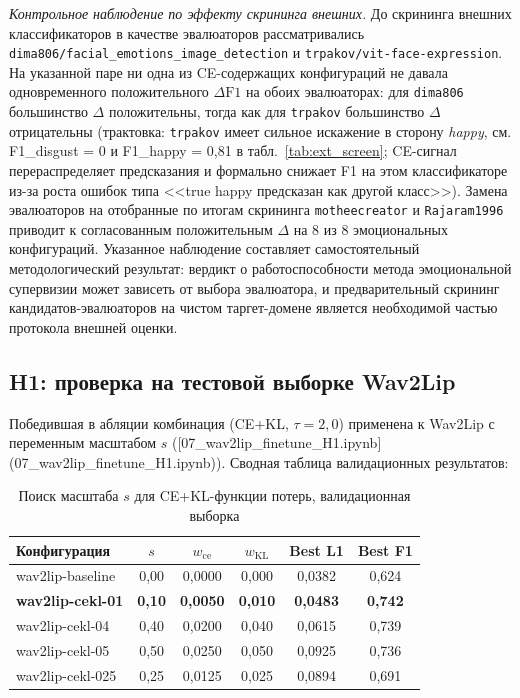 \documentclass[a4paper, 12pt, oneside, openany]{article}
\begin{document}
\textit{Контрольное наблюдение по эффекту скрининга внешних.} До скрининга внешних классификаторов в качестве эвалюаторов рассматривались \texttt{dima806/facial\_emotions\_image\_detection} и \texttt{trpakov/vit-face-expression}. На указанной паре ни одна из CE-содержащих конфигураций не давала одновременного положительного $\Delta\text{F1}$ на обоих эвалюаторах: для \texttt{dima806} большинство $\Delta$ положительны, тогда как для \texttt{trpakov} большинство $\Delta$ отрицательны (трактовка: \texttt{trpakov} имеет сильное искажение в сторону \textit{happy}, см. F1\_disgust = 0 и F1\_happy = 0,81 в табл.~\ref{tab:ext_screen}; CE-сигнал перераспределяет предсказания и формально снижает F1 на этом классификаторе из-за роста ошибок типа <<true happy предсказан как другой класс>>). Замена эвалюаторов на отобранные по итогам скрининга \texttt{motheecreator} и \texttt{Rajaram1996} приводит к согласованным положительным $\Delta$ на 8 из 8 эмоциональных конфигураций. Указанное наблюдение составляет самостоятельный методологический результат: вердикт о работоспособности метода эмоциональной супервизии может зависеть от выбора эвалюатора, и предварительный скрининг кандидатов-эвалюаторов на чистом таргет-домене является необходимой частью протокола внешней оценки.

\subsection{H1: проверка на тестовой выборке Wav2Lip}

Победившая в абляции комбинация (CE+KL, $\tau=2{,}0$) применена к Wav2Lip с переменным масштабом $s$ ([07\_wav2lip\_finetune\_H1.ipynb](07\_wav2lip\_finetune\_H1.ipynb)). Сводная таблица валидационных результатов:

\begin{table}[H]
\caption{Поиск масштаба $s$ для CE+KL-функции потерь, валидационная выборка}
\label{tab:scale_sweep}
\centering
\small
\begin{tabular}{|p{2.7cm}|c|c|c|c|c|}
\hline
\textbf{Конфигурация} & $s$ & $w_{\text{ce}}$ & $w_{\text{KL}}$ & \textbf{Best L1} & \textbf{Best F1} \\
\hline
wav2lip-baseline & 0,00 & 0,0000 & 0,000 & 0,0382 & 0,624 \\
\hline
\textbf{wav2lip-cekl-01} & \textbf{0,10} & \textbf{0,0050} & \textbf{0,010} & \textbf{0,0483} & \textbf{0,742} \\
\hline
wav2lip-cekl-04 & 0,40 & 0,0200 & 0,040 & 0,0615 & 0,739 \\
\hline
wav2lip-cekl-05 & 0,50 & 0,0250 & 0,050 & 0,0925 & 0,736 \\
\hline
wav2lip-cekl-025 & 0,25 & 0,0125 & 0,025 & 0,0894 & 0,691 \\
\hline
\end{tabular}
\end{table}
\end{document}
